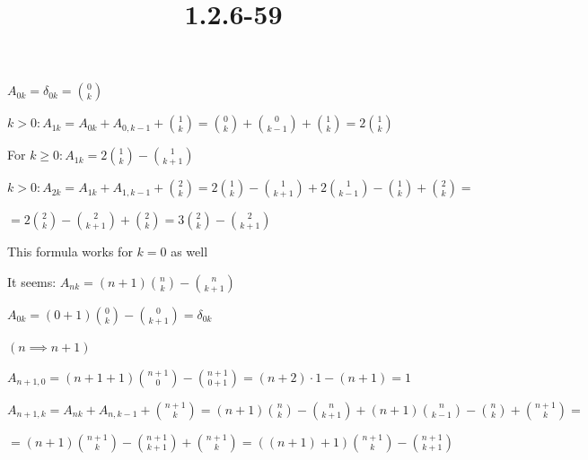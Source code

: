 \documentclass{article}
\title{1.2.6-59}
\begin{document}
\maketitle

\( A_{0k} = \delta_{0k} = \binom{0}{k} \)

\( k > 0: A_{1k} = A_{0k} + A_{0,k-1} + \binom{1}{k} = \binom{0}{k} + \binom{0}{k - 1} + \binom{1}{k} = 2 \binom{1}{k} \)

For \( k \geq 0: A_{1k} = 2\binom{1}{k} - \binom{1}{k + 1} \)

\( k > 0: A_{2k} = A_{1k} + A_{1,k-1} + \binom{2}{k} = 2\binom{1}{k} - \binom{1}{k+1} + 2\binom{1}{k-1} - \binom{1}{k} + \binom{2}{k} = \)

\( = 2\binom{2}{k} - \binom{2}{k+1} + \binom{2}{k} = 3 \binom{2}{k} - \binom{2}{k+1} \)

This formula works for \( k = 0 \) as well

It seems: \( A_{nk} = (n+1) \binom{n}{k} - \binom{n}{k+1} \)

\( A_{0k} = (0+1)\binom{0}{k} - \binom{0}{k+1} = \delta_{0k} \)

\( (n \implies n + 1) \)

\( A_{n+1,0} = (n+1+1)\binom{n+1}{0} - \binom{n+1}{0+1} = (n+2)\cdot 1 - (n + 1) = 1 \)

\( A_{n+1,k} = A_{nk} + A_{n,k-1} + \binom{n+1}{k} = (n+1) \binom{n}{k} - \binom{n}{k+1} + (n+1) \binom{n}{k - 1} - \binom{n}{k} + \binom{n+1}{k} = \)

\( = (n+1)\binom{n+1}{k} - \binom{n+1}{k+1} + \binom{n+1}{k} = ((n+1)+1)\binom{n+1}{k} - \binom{n+1}{k+1} \)
\end{document}
